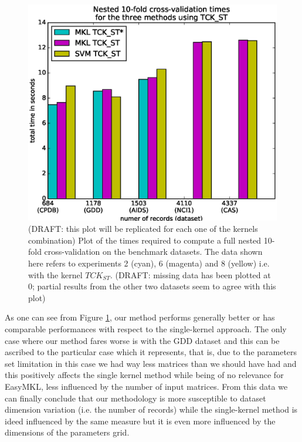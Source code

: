 \begin{figure}[ht]
    \centering
    \includegraphics[scale=0.7]{Figures/total_times}
    \caption{(DRAFT: this plot will be replicated for each one of the kernels combination)
        Plot of the times required to compute a full nested
        10-fold cross-validation on the benchmark datasets.
        The data shown here refers to experiments 2 (cyan), 6 (magenta) and 8 (yellow)
        i.e. with the kernel $TCK_{ST}$.
        (DRAFT: missing data has been plotted at 0; partial results from the other two datasets seem to agree with this plot)
    }
    \label{fig:datasetstimes}
\end{figure}

As one can see from Figure \ref{fig:datasetstimes}, our method performs generally
better or has comparable performances with respect to the single-kernel approach.
The only case where our method fares worse is with the GDD dataset and this can be
ascribed to the particular case which it represents, that is, due to the parameters
set limitation in this case we had way less matrices than we should have had and
this positively affects the single kernel method while being of no relevance for
EasyMKL, less influenced by the number of input matrices.
From this data we can finally conclude that our methodology is more susceptible
to dataset dimension variation (i.e. the number of records) while the single-kernel
method is ideed influenced by the same measure but it is even more influenced by
the dimensions of the parameters grid.


